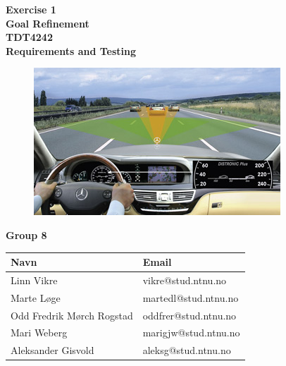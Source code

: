 \begin{titlepage}
\begin{center}

{\Huge \bf Exercise 1} \\[0.5cm]
{\Huge \bf Goal Refinement} \\[1.0cm]

{\Large \bf TDT4242} \\ [0.5cm]
{\Large \bf Requirements and Testing} \\[2.0cm]

\begin{figure}[H]
	\centering
	\includegraphics[width=\textwidth]{pics/frontpage.jpg}
\end{figure}

\vspace{2cm}
{\Large \bf Group 8} \\
\vspace{1cm}

\begin{table}[H]
	\centering
	\begin{tabular}{| l | l |}
		\hline
		Navn & Email \\ \hline
		Linn Vikre & vikre@stud.ntnu.no \\ \hline
		Marte Løge & martedl@stud.ntnu.no \\ \hline
		Odd Fredrik Mørch Rogstad & oddfrer@stud.ntnu.no \\ \hline
		Mari Weberg & marigjw@stud.ntnu.no \\ \hline
		Aleksander Gisvold & aleksg@stud.ntnu.no \\ \hline
	\end{tabular}
\end{table}

\end{center}
\end{titlepage}